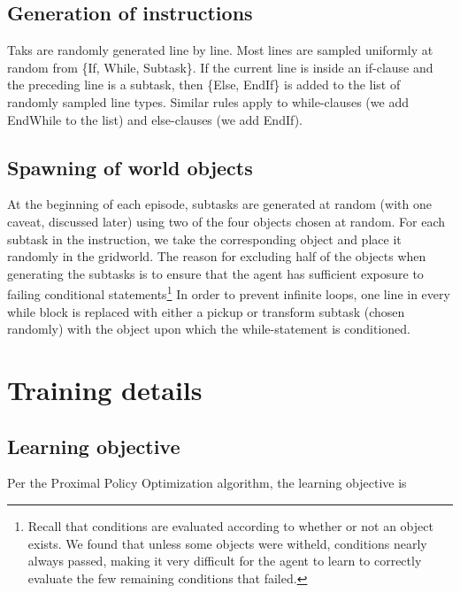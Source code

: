 \documentclass{article}
\begin{document}
\subsection{Generation of instructions}
Taks are randomly generated line by line. Most lines are sampled uniformly at
random from \{If, While, Subtask\}. If the current line is inside an if-clause and
the preceding line is a subtask, then \{Else, EndIf\} is added to the list of
randomly sampled line types. Similar rules apply to while-clauses (we add
EndWhile to the list) and else-clauses (we add EndIf). 


\subsection{Spawning of world objects}
At the beginning of each episode, subtasks are generated at random (with one caveat, discussed later) using two of the four objects  chosen at random. 
For each subtask in the instruction, we take the corresponding object and place it randomly in the gridworld. The reason for excluding half of the objects when generating the subtasks is to ensure that the agent has sufficient exposure to failing conditional statements\footnote{Recall that conditions are evaluated according to whether or not an object exists. We found that unless some objects were witheld, conditions nearly always passed, making it very difficult for the agent to learn to correctly evaluate the few remaining conditions that failed.} In order to prevent infinite loops, one line in every while block is replaced with either a pickup or transform subtask (chosen randomly) with the object upon which the while-statement is conditioned. 


\section{Training details}
\label{training}
\subsection{Learning objective}
Per the Proximal Policy Optimization algorithm, the learning objective is
\end{document}
